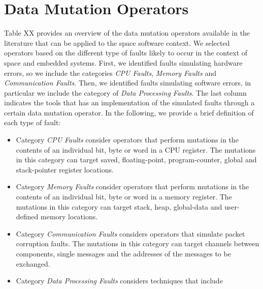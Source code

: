 
\section{Data Mutation Operators}
\label{sec:data_operators}

Table XX provides an overview of the data mutation operators available in the literature that can be applied to the space software context.
We selected operators based on the different type of faults likely to occur in the context of space and embedded systems. 
First, we identified faults simulating hardware errors, so we include the categories \emph{CPU Faults}, \emph{Memory Faults} and \emph{Communication Faults}. Then, we identified faults simulating software errors, in particular we include the category of \emph{Data Processing Faults}. The last column indicates the tools that has an implementation of the simulated faults through a certain data mutation operator. In the following, we provide a brief definition of each type of fault:

\begin{itemize}
	\item Category \emph{CPU Faults} consider operators that perform mutations in the contents of an individual bit, byte or word in a CPU register. The mutations in this category can target saved, floating-point, program-counter, global and stack-pointer register locations. 
	\item Category \emph{Memory Faults} consider operators that perform mutations in the contents of an individual bit, byte or word in a memory register. The mutations in this category can target stack, heap, global-data and user-defined memory locations.
	\item Category \emph{Communication Faults} considers operators that simulate packet corruption faults. The mutations in this category can target channels between components, single messages and the addresses of the messages to be exchanged.
	\item Category \emph{Data Processing Faults} considers techniques that include 
\end{itemize}